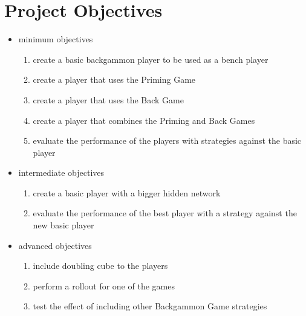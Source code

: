 \chapter{Project Objectives}
\begin{itemize}
\item minimum objectives
\begin{enumerate}
\item create a basic backgammon player to be used as a bench player 
\item create a player that uses the Priming Game 
\item create a player that uses the Back Game
\item create a player that combines the Priming and Back Games
\item evaluate the performance of the players with strategies against the basic player
\end{enumerate}
\item intermediate objectives
\begin{enumerate}
\item create a basic player with a bigger hidden network  
\item evaluate the performance of the best player with a strategy against the new basic player
\end{enumerate}
\item advanced objectives
\begin{enumerate}
\item include doubling cube to the players  
\item perform a rollout for one of the games
\item test the effect of including other Backgammon Game strategies
\end{enumerate}
\end{itemize}
